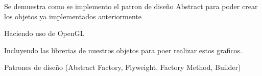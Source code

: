 Se demuestra como se implemento el patron de diseño Abstract para poder crear los objetos ya implementados anteriormente


\begin{DoxyItemize}
\item Haciendo uso de Open\+GL
\item Incluyendo las librerias de nuestros objetos para poer realizar estos graficos.
\item Patrones de diseño (Abstract Factory, Flyweight, Factory Method, Builder) 
\end{DoxyItemize}